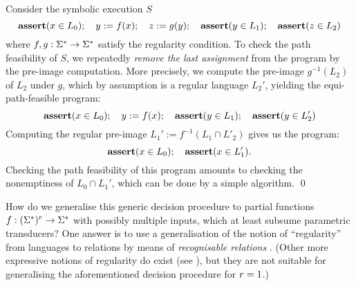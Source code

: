 \begin{example} \label{ex:unif}
    Consider the symbolic execution $S$
    \[
        \textbf{assert}(x \in L_0); \quad y := f(x); \quad z := g(y); 
        \quad \textbf{assert}(y \in L_1); \quad \textbf{assert}(z \in L_2)
    \]
    where $f, g: \Sigma^* \to \Sigma^*$ satisfy the regularity 
    condition. To check the path feasibility of $S$, we repeatedly \emph{remove the last
    assignment} from the program by the pre-image computation. More
    precisely, we compute the pre-image $g^{-1}(L_2)$
    of $L_2$ under $g$, which by assumption is a regular language $L_2'$,
    yielding the equi-path-feasible program:
    \[
        \textbf{assert}(x \in L_0); \quad y := f(x); \quad \textbf{assert}(y \in L_1); \quad  \textbf{assert}(y \in L_2') 
    \]
    Computing the regular pre-image $L_1' := f^{-1}(L_1 \cap L'_2)$ gives us
    the program:
    \[
        \textbf{assert}(x \in L_0); \quad \textbf{assert}(x \in L_1').
    \]
%
    Checking the path feasibility of this program amounts to checking the nonemptiness of
    $L_0 \cap L_1'$, which can be done by a simple \FA{} algorithm.
    \qed
\end{example}
How do we generalise this generic decision procedure to partial functions $f: 
(\Sigma^*)^r \to \Sigma^*$ with possibly multiple inputs, which at least
subsume parametric transducers? 
One answer is to use a generalisation of
the notion of ``regularity'' from languages to relations 
by means of \emph{recognisable relations} \cite{choffrut-survey}.
(Other more expressive notions of regularity do exist (see \cite{choffrut-survey}),
but they are not suitable for generalising the aforementioned decision
procedure for $r=1$.)
%

